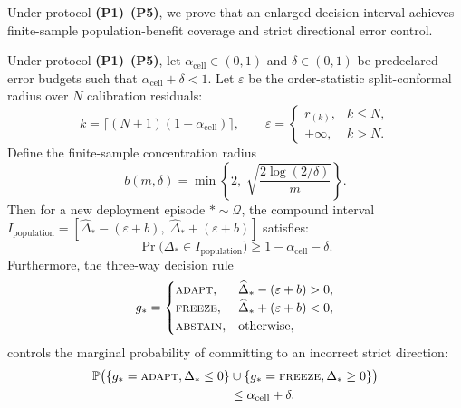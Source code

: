 Under protocol \textbf{(P1)}--\textbf{(P5)}, we prove that an enlarged decision interval achieves finite-sample
population-benefit coverage and strict directional error control.

\begin{theorem}\label{thm:app-pop-cert}
Under protocol \textbf{(P1)}--\textbf{(P5)}, let $\alpha_{\mathrm{cell}} \in (0, 1)$ and $\delta \in (0, 1)$ be
predeclared error budgets such that $\alpha_{\mathrm{cell}} + \delta < 1$. Let $\varepsilon$ be the order-statistic
split-conformal radius over $N$ calibration residuals:
\begin{equation}
 k = \lceil(N+1)(1-\alpha_{\mathrm{cell}})\rceil, \qquad
 \varepsilon = \begin{cases} r_{(k)}, & k \le N, \\ +\infty, & k > N. \end{cases}
\end{equation}
Define the finite-sample concentration radius
\begin{equation}
 b(m, \delta) = \min\left\{2, \; \sqrt{\frac{2\log(2/\delta)}{m}}\right\}.
 \label{eq:app-hoeffding-radius}
\end{equation}
Then for a new deployment episode $* \sim \mathcal Q$, the compound interval
$I_{\mathrm{population}} = [\widehat\Delta_* - (\varepsilon + b), \; \widehat\Delta_* + (\varepsilon + b)]$
satisfies:
\begin{equation}
 \Pr\bigl(\Delta_* \in I_{\mathrm{population}}\bigr) \ge 1 - \alpha_{\mathrm{cell}} - \delta.
\end{equation}
Furthermore, the three-way decision rule
\begin{equation}
 g_* = \begin{cases}
 \textnormal{\textsc{adapt}}, & \widehat\Delta_* - (\varepsilon + b) > 0, \\
 \textnormal{\textsc{freeze}}, & \widehat\Delta_* + (\varepsilon + b) < 0, \\
 \textnormal{\textsc{abstain}}, & \text{otherwise},
 \end{cases}
\end{equation}
controls the marginal probability of committing to an incorrect strict direction:
\begin{align}
 \mathbb{P}\bigl(\{g_* = \textnormal{\textsc{adapt}}, \Delta_* \le 0\} &\cup \{g_* = \textnormal{\textsc{freeze}}, \Delta_* \ge 0\}\bigr) \notag \\
 &\le \alpha_{\mathrm{cell}} + \delta.
\end{align}
\end{theorem}

